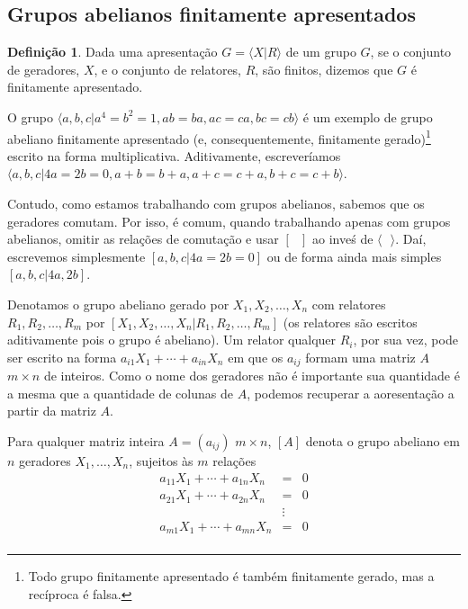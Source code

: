 \documentclass[a4paper,portuguese,11pt,twoside, leqno]{book}
\theoremstyle{definition}
\newtheorem{deff}{Definição}[section]
\begin{document}
	\subsection{Grupos abelianos finitamente apresentados}
	\begin{deff}
		\label{def grupo finitamente apresentado}
		Dada uma apresentação $G = \langle X|R \rangle$ de um grupo $G$, se o conjunto de geradores, $X$, e o conjunto de relatores, $R$, são finitos, dizemos que $G$ é finitamente apresentado.
	\end{deff}
	\par\vspace{0.3cm} O grupo $\langle a,b,c|a^4=b^2=1, ab=ba, ac=ca,bc=cb \rangle $ é um exemplo de grupo abeliano finitamente apresentado (e, consequentemente, finitamente gerado)\footnote{Todo grupo finitamente apresentado é também finitamente gerado, mas a recíproca é falsa.} escrito na forma multiplicativa. Aditivamente, escreveríamos $\langle a,b,c|4a=2b=0, a+b=b+a, a+c=c+a, b+c=c+b \rangle$. 
	\par\vspace{0.3cm} Contudo, como estamos trabalhando com grupos abelianos, sabemos que os geradores comutam. Por isso, é comum, quando trabalhando apenas com grupos abelianos, omitir as relações de comutação e usar $[ \text{ } ]$ ao inveś de $\langle \text{ } \rangle$. Daí, escrevemos simplesmente $[a,b,c\vert 4a=2b=0]$ ou de forma ainda mais simples $[a,b,c|4a,2b]$.
	\par\vspace{0.3cm} Denotamos o grupo abeliano gerado por $X_1, X_2, \dots, X_n$ com relatores $R_1, R_2, \dots, R_m$ por $[X_1, X_2, \dots, X_n\vert R_1, R_2, \dots, R_m]$ (os relatores são escritos aditivamente pois o grupo é abeliano). Um relator qualquer $R_i$, por sua vez, pode ser escrito na forma $a_{i1}X_1+ \cdots +a_{in}X_n$ em que os $a_{ij}$ formam uma matriz $A$ $m\times n$ de inteiros. Como o nome dos geradores não é importante sua quantidade é a mesma que a quantidade de colunas de $A$, podemos recuperar a aoresentação a partir da matriz $A$.
	\par\vspace{0.3cm} Para qualquer matriz inteira $A=(a_{ij})$ $m\times n$, $[A]$ denota o grupo abeliano em $n$ geradores $X_1, \dots, X_n$, sujeitos às $m$ relações
	\begin{equation*}
	\begin{array}{ccc}
	a_{11}X_1 +  \cdots  + a_{1n}X_n & = & 0 \\
	a_{21}X_1 +  \cdots  + a_{2n}X_n & = & 0 \\
	& \vdots &  \\
	a_{m1}X_1 +  \cdots  + a_{mn}X_n & = & 0 \\
	\end{array} 	
	\end{equation*}
\end{document}
